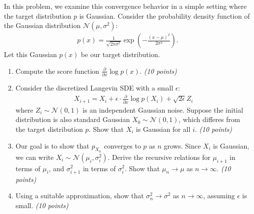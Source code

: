 \documentclass[12pt]{article}
\begin{document}
\begin{enumerate}
In this problem, we examine this convergence behavior in a simple setting where the target distribution $p$ is Gaussian.
Consider the probability density function of the Gaussian distribution $\mathcal{N}(\mu, \sigma^2)$:
\begin{align*}
    p(x) = \frac{1}{\sqrt{2\pi \sigma^2}} \exp\left(-\frac{(x-\mu)^2}{2\sigma^2}\right).
\end{align*}
Let this Gaussian $p(x)$ be our target distribution.

\begin{enumerate}
    \item Compute the score function $\frac{\partial}{\partial x} \log p(x)$. {\it (10 points)}
    \item Consider the discretized Langevin SDE with a small $\epsilon$:
    \begin{align*}
        X_{i+1} = X_i + \epsilon \cdot \frac{\partial}{\partial x}\log p(X_i) +\sqrt{2\epsilon}Z_i
    \end{align*}
    where $Z_i\sim \mathcal{N}(0, 1)$ is an independent Gaussian noise.
    Suppose the initial distribution is also standard Gaussian $X_0 \sim \mathcal{N}(0, 1)$,
    which differes from the target distribution $p$.
    Show that $X_i$ is Gaussian for all $i$. {\it (10 points)}
    \item Our goal is to show that $p_{X_n}$ converges to $p$ as $n$ grows.
    Since $X_i$ is Gaussian, we can write $X_i\sim \mathcal{N}(\mu_i, \sigma_i^2)$.
    Derive the recursive relations for $\mu_{i+1}$ in terms of $\mu_i$, and $\sigma_{i+1}^2$ in terms of $\sigma_i^2$.
    Show that $\mu_n\rightarrow \mu$ as $n\rightarrow \infty$. {\it (10 points)}
    \item Using a suitable approximation, show that $\sigma_n^2\rightarrow \sigma^2$ as $n\rightarrow \infty$,
    assuming $\epsilon$ is small.
     {\it (10 points)}
\end{enumerate}

\begin{problem}
    \newpage~\newpage~\newpage~\newpage
\end{problem}

\end{enumerate}
\end{document}
